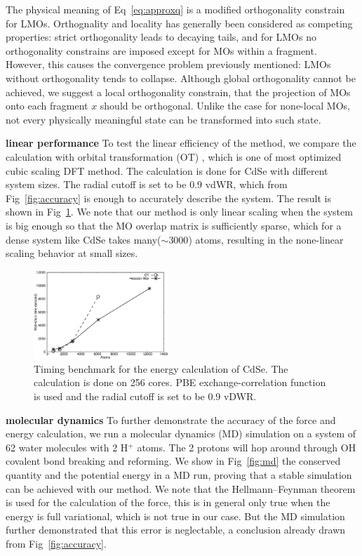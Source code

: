 \documentclass[aps,prl,twocolumn,reprint,amsmath,amssymb]{revtex4-1}
\begin{document}
The physical meaning of Eq~\ref{eq:approxq} is a modified orthogonality constrain for LMOs. Orthognality and locality has generally been considered as competing properties: strict orthogonality leads to decaying tails, and for LMOs no orthogonality constrains are imposed except for MOs within a fragment. However, this causes the convergence problem previously mentioned: LMOs without orthogonality tends to collapse. Although global orthogonality cannot be achieved, we suggest a local orthogonality constrain, that the projection of MOs onto each fragment $x$ should be orthogonal. Unlike the case for none-local MOs, not every physically meaningful state can be transformed into such state.

\textbf{linear performance}
To test the linear efficiency of the method, we compare the calculation with orbital transformation (OT) \cite{weber2008direct,vandevondele2003efficient}, which is one of most optimized cubic scaling DFT method. The calculation is done for CdSe with different system sizes. The radial cutoff is set to be 0.9 vdWR, which from Fig~\ref{fig:accuracy} is enough to accurately describe the system. The result is shown in Fig~\ref{fig:scaling}. We note that our method is only linear scaling when the system is big enough so that the MO overlap matrix is sufficiently sparse, which for a dense system like CdSe takes many($\sim 3000$) atoms, resulting in the none-linear scaling behavior at small sizes.

\begin{figure}
\includegraphics[width=0.45\textwidth]{timing}
\caption{Timing benchmark for the energy calculation of CdSe. The calculation is done on 256 cores. PBE exchange-correlation function is used and the radial cutoff is set to be 0.9 vDWR.}
\label{fig:scaling}
\end{figure}



\textbf{molecular dynamics}
To further demonstrate the accuracy of the force and energy calculation, we run a molecular dynamics (MD) simulation on a system of 62 water molecules with 2 H$^+$ atoms. The 2 protons will hop around through OH covalent bond breaking and reforming. We show in Fig~\ref{fig:md} the conserved quantity and the potential energy in a MD run, proving that a stable simulation can be achieved with our method. We note that the Hellmann–Feynman theorem\cite{feynman1939forces} is used for the calculation of the force, this is in general only true when the energy is full variational, which is not true in our case. But the MD simulation further demonstrated that this error is neglectable, a conclusion already drawn from Fig~\ref{fig:accuracy}.
\end{document}
